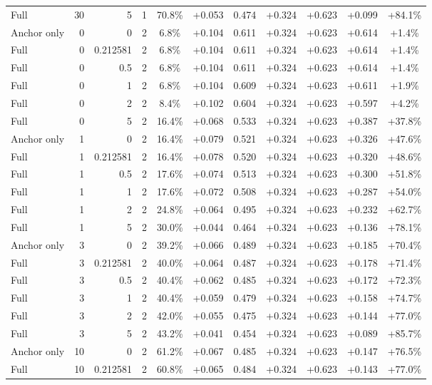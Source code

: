 \begin{table}[htbp]
\begin{tabular}{lrrrccccccc}
Full & 30 & 5 & 1 & 70.8\% & +0.053 & 0.474 & +0.324 & +0.623 & +0.099 & +84.1\% \\
Anchor only & 0 & 0 & 2 & 6.8\% & +0.104 & 0.611 & +0.324 & +0.623 & +0.614 & +1.4\% \\
Full & 0 & 0.212581 & 2 & 6.8\% & +0.104 & 0.611 & +0.324 & +0.623 & +0.614 & +1.4\% \\
Full & 0 & 0.5 & 2 & 6.8\% & +0.104 & 0.611 & +0.324 & +0.623 & +0.614 & +1.4\% \\
Full & 0 & 1 & 2 & 6.8\% & +0.104 & 0.609 & +0.324 & +0.623 & +0.611 & +1.9\% \\
Full & 0 & 2 & 2 & 8.4\% & +0.102 & 0.604 & +0.324 & +0.623 & +0.597 & +4.2\% \\
Full & 0 & 5 & 2 & 16.4\% & +0.068 & 0.533 & +0.324 & +0.623 & +0.387 & +37.8\% \\
Anchor only & 1 & 0 & 2 & 16.4\% & +0.079 & 0.521 & +0.324 & +0.623 & +0.326 & +47.6\% \\
Full & 1 & 0.212581 & 2 & 16.4\% & +0.078 & 0.520 & +0.324 & +0.623 & +0.320 & +48.6\% \\
Full & 1 & 0.5 & 2 & 17.6\% & +0.074 & 0.513 & +0.324 & +0.623 & +0.300 & +51.8\% \\
Full & 1 & 1 & 2 & 17.6\% & +0.072 & 0.508 & +0.324 & +0.623 & +0.287 & +54.0\% \\
Full & 1 & 2 & 2 & 24.8\% & +0.064 & 0.495 & +0.324 & +0.623 & +0.232 & +62.7\% \\
Full & 1 & 5 & 2 & 30.0\% & +0.044 & 0.464 & +0.324 & +0.623 & +0.136 & +78.1\% \\
Anchor only & 3 & 0 & 2 & 39.2\% & +0.066 & 0.489 & +0.324 & +0.623 & +0.185 & +70.4\% \\
Full & 3 & 0.212581 & 2 & 40.0\% & +0.064 & 0.487 & +0.324 & +0.623 & +0.178 & +71.4\% \\
Full & 3 & 0.5 & 2 & 40.4\% & +0.062 & 0.485 & +0.324 & +0.623 & +0.172 & +72.3\% \\
Full & 3 & 1 & 2 & 40.4\% & +0.059 & 0.479 & +0.324 & +0.623 & +0.158 & +74.7\% \\
Full & 3 & 2 & 2 & 42.0\% & +0.055 & 0.475 & +0.324 & +0.623 & +0.144 & +77.0\% \\
Full & 3 & 5 & 2 & 43.2\% & +0.041 & 0.454 & +0.324 & +0.623 & +0.089 & +85.7\% \\
Anchor only & 10 & 0 & 2 & 61.2\% & +0.067 & 0.485 & +0.324 & +0.623 & +0.147 & +76.5\% \\
Full & 10 & 0.212581 & 2 & 60.8\% & +0.065 & 0.484 & +0.324 & +0.623 & +0.143 & +77.0\% \\

\end{tabular}
\end{table}
